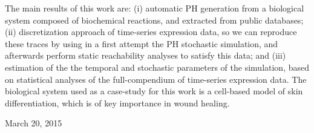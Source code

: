 The main  results of this work are: (i) automatic PH generation                                                         
from a biological system composed of biochemical reactions, and extracted from public databases;
(ii) discretization approach of time-series expression data, so we can 
reproduce these traces by using in a first attempt the PH stochastic simulation, and afterwards 
perform static reachability analyses to satisfy this data; and (iii) estimation of the the temporal and stochastic
parameters of the simulation, based on statistical analyses of the full-compendium of time-series expression data.
The biological system used as a case-study for this work is a cell-based model of skin differentiation, which 
is of key importance in  wound healing. 



 
\hfill March 20, 2015